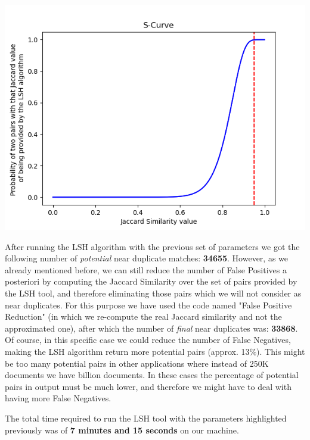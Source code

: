 \documentclass[12pt]{article}
\begin{document}
\begin{center}
\includegraphics[scale=.75]{Splot.png}
\end{center}

After running the LSH algorithm with the previous set of parameters we got the following number of \textit{potential} near duplicate matches: \textbf{34655}. However, as we already mentioned before, we can still reduce the number of False Positives a posteriori by computing the Jaccard Similarity over the set of pairs provided by the LSH tool, and therefore eliminating those pairs which we will not consider as near duplicates. For this purpose we have used the code named "False Positive Reduction" (in which we re-compute the real Jaccard similarity and not the approximated one), after which the number of \textit{final} near duplicates was: \textbf{33868}. Of course, in this specific case we could reduce the number of  False Negatives, making the LSH algorithm return more potential pairs (approx. 13$\%$). This might be too many potential pairs in other applications where instead of 250K documents we have billion documents. In these cases the percentage of potential pairs in output must be much lower, and therefore we might have to deal with having more False Negatives.

The total time required to run the LSH tool with the parameters highlighted previously was of \textbf{7 minutes and 15 seconds} on our machine.
\end{document}
